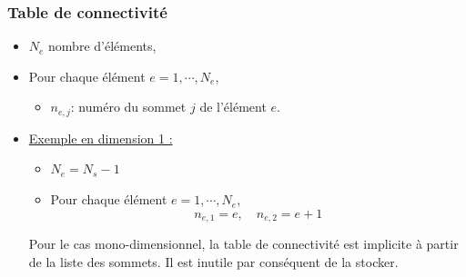\documentclass{beamer}
\begin{document}
\begin{frame}
\frametitle{Table de connectivité}
\begin{itemize}
\item  $N_e$ nombre d'éléments,
\item  Pour chaque élément $e=1,\cdots, N_e$,
    \begin{itemize}
        \item $n_{e,j}$: numéro du sommet $j$ de l'élément $e$.
     \end{itemize}
     \item \underline{Exemple en dimension 1 :} 
		\begin{itemize}
		    \item $N_e=N_s-1$
        		\item Pour chaque élément $e=1,\cdots, N_e$,
        		\[n_{e,1}=e,\quad n_{e,2}=e+1\]
     	\end{itemize}
Pour le cas mono-dimensionnel, la table de connectivité est implicite à partir de la liste des sommets. Il est inutile par conséquent de la stocker.
\end{itemize}     


\end{frame}
\end{document}
